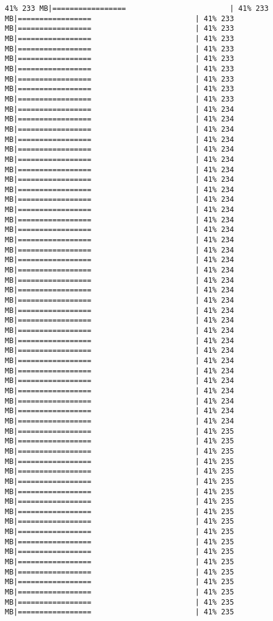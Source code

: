 \documentclass[
]{article}
\begin{document}
\begin{verbatim}
41% 233 MB|=================                        | 41% 233 MB|=================                        | 41% 233 MB|=================                        | 41% 233 MB|=================                        | 41% 233 MB|=================                        | 41% 233 MB|=================                        | 41% 233 MB|=================                        | 41% 233 MB|=================                        | 41% 233 MB|=================                        | 41% 233 MB|=================                        | 41% 233 MB|=================                        | 41% 234 MB|=================                        | 41% 234 MB|=================                        | 41% 234 MB|=================                        | 41% 234 MB|=================                        | 41% 234 MB|=================                        | 41% 234 MB|=================                        | 41% 234 MB|=================                        | 41% 234 MB|=================                        | 41% 234 MB|=================                        | 41% 234 MB|=================                        | 41% 234 MB|=================                        | 41% 234 MB|=================                        | 41% 234 MB|=================                        | 41% 234 MB|=================                        | 41% 234 MB|=================                        | 41% 234 MB|=================                        | 41% 234 MB|=================                        | 41% 234 MB|=================                        | 41% 234 MB|=================                        | 41% 234 MB|=================                        | 41% 234 MB|=================                        | 41% 234 MB|=================                        | 41% 234 MB|=================                        | 41% 234 MB|=================                        | 41% 234 MB|=================                        | 41% 234 MB|=================                        | 41% 234 MB|=================                        | 41% 234 MB|=================                        | 41% 234 MB|=================                        | 41% 234 MB|=================                        | 41% 234 MB|=================                        | 41% 234 MB|=================                        | 41% 235 MB|=================                        | 41% 235 MB|=================                        | 41% 235 MB|=================                        | 41% 235 MB|=================                        | 41% 235 MB|=================                        | 41% 235 MB|=================                        | 41% 235 MB|=================                        | 41% 235 MB|=================                        | 41% 235 MB|=================                        | 41% 235 MB|=================                        | 41% 235 MB|=================                        | 41% 235 MB|=================                        | 41% 235 MB|=================                        | 41% 235 MB|=================                        | 41% 235 MB|=================                        | 41% 235 MB|=================                        | 41% 235 MB|=================                        | 41% 235 MB|=================                        | 41% 235 
\end{verbatim}
\end{document}
